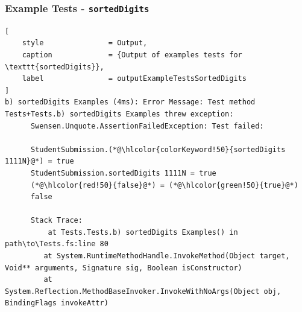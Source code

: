 


\newpage %
\subsubsection{Example Tests - \texttt{sortedDigits}} %







\begin{lstlisting}[
	style               = Output,
	caption				= {Output of examples tests for \texttt{sortedDigits}},
	label				= outputExampleTestsSortedDigits
]
b) sortedDigits Examples (4ms): Error Message: Test method Tests+Tests.b) sortedDigits Examples threw exception:
      Swensen.Unquote.AssertionFailedException: Test failed:

      StudentSubmission.(*@\hlcolor{colorKeyword!50}{sortedDigits 1111N}@*) = true
      StudentSubmission.sortedDigits 1111N = true
      (*@\hlcolor{red!50}{false}@*) = (*@\hlcolor{green!50}{true}@*)
      false

      Stack Trace:
          at Tests.Tests.b) sortedDigits Examples() in path\to\Tests.fs:line 80
         at System.RuntimeMethodHandle.InvokeMethod(Object target, Void** arguments, Signature sig, Boolean isConstructor)
         at System.Reflection.MethodBaseInvoker.InvokeWithNoArgs(Object obj, BindingFlags invokeAttr)
\end{lstlisting}


